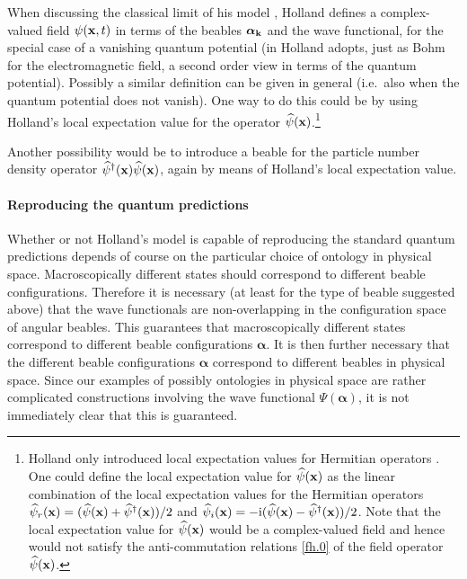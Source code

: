 \documentclass[12pt]{article}
\def\ii{\textrm i}
\begin{document}
When discussing the classical limit of his model \cite[pp.\ 455-457]{holland93b}, Holland defines a complex-valued field $\psi({\bf x},t)$ in terms of the beables ${\boldsymbol \alpha}_{\bf k}$ and the wave functional, for the special case of a vanishing quantum potential (in \cite{holland93b} Holland adopts, just as Bohm for the electromagnetic field, a second order view in terms of the quantum potential). Possibly a similar definition can be given in general (i.e.\ also when the quantum potential does not vanish). One way to do this could be by using Holland's local expectation value for the operator ${\widehat \psi}({\bf x})$.{\footnote{Holland only introduced local expectation values for Hermitian operators \cite{holland93b}. One could define the local expectation value for ${\widehat \psi}({\bf x})$ as the linear combination of the local expectation values for the Hermitian operators ${\widehat \psi}_r({\bf x}) = ({\widehat \psi}({\bf x}) + {\widehat \psi}^\dagger({\bf x}) )/2$ and ${\widehat \psi}_i({\bf x}) = -\ii ({\widehat \psi}({\bf x}) - {\widehat \psi}^\dagger({\bf x}) )/2$. Note that the local expectation value for ${\widehat \psi}({\bf x})$ would be a complex-valued field and hence would not satisfy the anti-commutation relations \eqref{fh.0} of the field operator ${\widehat \psi}({\bf x})$.}}

Another possibility would be to introduce a beable for the particle number density operator ${\widehat \psi}^\dagger({\bf x}){\widehat \psi}({\bf x})$, again by means of Holland's local expectation value. 


\paragraph{Reproducing the quantum predictions}
Whether or not Holland's model is capable of reproducing the standard quantum predictions depends of course on the particular choice of ontology in physical space. Macroscopically different states should correspond to different beable configurations. Therefore it is necessary (at least for the type of beable suggested above) that the wave functionals are non-overlapping in the configuration space of angular beables. This guarantees that macroscopically different states correspond to different beable configurations ${\boldsymbol \alpha}$. It is then further necessary that the different beable configurations ${\boldsymbol \alpha}$ correspond to different beables in physical space. Since our examples of possibly ontologies in physical space are rather complicated constructions involving the wave functional $\Psi({\boldsymbol \alpha})$, it is not immediately clear that this is guaranteed. 
\end{document}
